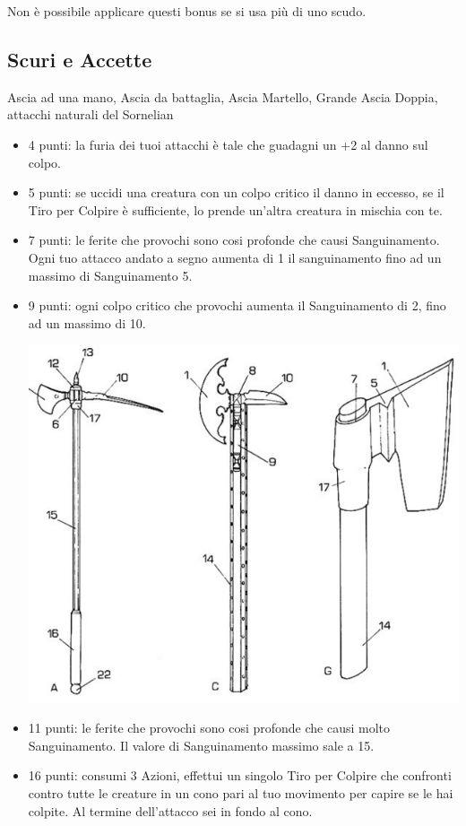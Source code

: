 \begin{multicols}{2}
\begin{itemize}[leftmargin=*]
Non è possibile applicare questi bonus se si usa più di uno scudo.

\end{itemize}

\subsection{Scuri e Accette} Ascia ad una mano, Ascia da battaglia, Ascia Martello, Grande Ascia Doppia, attacchi naturali del Sornelian\label{listaasce}

\begin{itemize}[leftmargin=*] \setlength{\itemsep}{0pt}

\item 4 punti: la furia dei tuoi attacchi è tale che guadagni un +2 al danno sul colpo.
\item 5 punti: se uccidi una creatura con un colpo critico il danno in eccesso, se il Tiro per Colpire è sufficiente, lo prende un'altra creatura in mischia con te.
\item 7 punti: le ferite che provochi sono cosi profonde che causi Sanguinamento. Ogni tuo attacco andato a segno aumenta di 1 il sanguinamento fino ad un massimo di Sanguinamento 5.
\item 9 punti: ogni colpo critico che provochi aumenta il Sanguinamento di 2, fino ad un massimo di 10.

\smallskip

\begin{center}
	\includegraphics[width=0.7\linewidth]{immagini/scurieaccette.png}
\end{center}

\item 11 punti: le ferite che provochi sono cosi profonde che causi molto Sanguinamento. Il valore di Sanguinamento massimo sale a 15.
\item 16 punti: consumi 3 Azioni, effettui un singolo Tiro per Colpire che confronti contro tutte le creature in un cono pari al tuo movimento per capire se le hai colpite. Al termine dell'attacco sei in fondo al cono.


\end{itemize}
\end{multicols}
